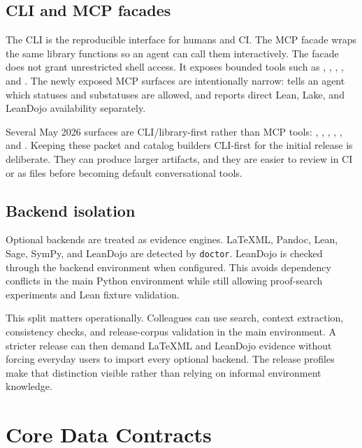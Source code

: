 \documentclass[12pt,a4paper,openany]{book}
\begin{document}
\section{CLI and MCP facades}

The CLI is the reproducible interface for humans and CI. The MCP facade wraps
the same library functions so an agent can call them interactively. The facade
does not grant unrestricted shell access. It exposes bounded tools such as
, ,
, , and
. The newly exposed MCP surfaces are intentionally
narrow:  tells an agent which statuses and substatuses are
allowed, and  reports direct Lean, Lake, and LeanDojo
availability separately.

Several May 2026 surfaces are CLI/library-first rather than MCP tools:
, ,
, ,
, and . Keeping these
packet and catalog builders CLI-first for the initial release is deliberate.
They can produce larger artifacts, and they are easier to review in CI or as
files before becoming default conversational tools.

\section{Backend isolation}

Optional backends are treated as evidence engines. LaTeXML, Pandoc, Lean, Sage,
SymPy, and LeanDojo are detected by \texttt{doctor}. LeanDojo is checked through
the backend environment when configured. This avoids dependency conflicts in
the main Python environment while still allowing proof-search experiments and
Lean fixture validation.

This split matters operationally. Colleagues can use search, context extraction,
consistency checks, and release-corpus validation in the main environment. A
stricter release can then demand LaTeXML and LeanDojo evidence without forcing
everyday users to import every optional backend. The release profiles make that
distinction visible rather than relying on informal environment knowledge.

\chapter{Core Data Contracts}
\end{document}
